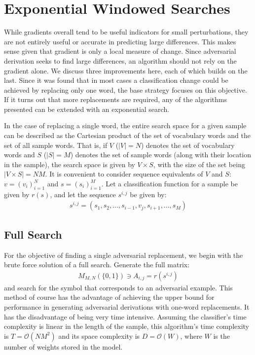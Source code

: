 \chapter{Exponential Windowed Searches}
While gradients overall tend to be useful indicators for small perturbations, they are not entirely useful or accurate in predicting large differences.  This makes sense given that gradient is only a local measure of change.  Since adversarial derivation seeks to find large differences, an algorithm should not rely on the gradient alone.  We discuss three improvements here, each of which builds on the last.  Since it was found that in most cases a classification change could be achieved by replacing only one word, the base strategy focuses on this objective.  If it turns out that more replacements are required, any of the algorithms presented can be extended with an exponential search.

In the case of replacing a single word, the entire search space for a given sample can be described as the Cartesian product of the set of vocabulary words and the set of all sample words.  That is, if $V$ ($|V| = N$) denotes the set of vocabulary words and $S$ ($|S| = M$) denotes the set of sample words (along with their location in the sample), the search space is given by $V\times S$, with the size of the set being $|V\times S| = NM$.  It is convenient to consider sequence equivalents of $V$ and $S$: $v = (v_i)_{i=1}^N$ and $s = (s_i)_{i=1}^M$.  Let a classification function for a sample be given by $r(s)$, and let the sequence $s^{i,j}$ be given by:
\begin{align}\label{eq:replacement_sequence}
s^{i,j} = (s_1,s_2,\dots,s_{i-1},v_j,s_{i+1},\dots,s_M)
\end{align}

\section{Full Search}
For the objective of finding a single adversarial replacement, we begin with the brute force solution of a full search.  Generate the full matrix: 
\begin{align}\label{eq:class_matrix}
M_{M,N}(\{0,1\}) \ni A_{i,j} = r(s^{i,j})
\end{align}
and search for the symbol that corresponds to an adversarial example.
This method of course has the advantage of achieving the upper bound for performance in generating adversarial derivations with one-word replacements.  It has the disadvantage of being very time intensive.  Assuming the classifier's time complexity is linear in the length of the sample, this algorithm's time complexity is $T=\mathcal{O}(NM^2)$ and its space complexity is $D=\mathcal{O}(W)$, where $W$ is the number of weights stored in the model.

